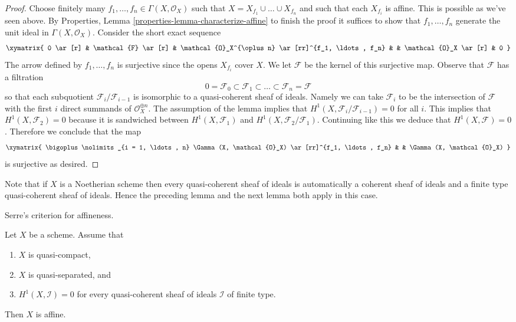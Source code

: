 \begin{proof}
\medskip\noindent
Choose finitely many $f_1, \ldots, f_n \in \Gamma(X, \mathcal{O}_X)$
such that $X = X_{f_1} \cup \ldots \cup X_{f_n}$ and such that each
$X_{f_i}$ is affine. This is possible as we've seen above.
By Properties, Lemma \ref{properties-lemma-characterize-affine}
to finish the proof it suffices
to show that $f_1, \ldots, f_n$ generate the unit ideal in
$\Gamma(X, \mathcal{O}_X)$. Consider the short exact sequence
$$
\xymatrix{
0 \ar[r] &
\mathcal{F} \ar[r] &
\mathcal{O}_X^{\oplus n} \ar[rr]^{f_1, \ldots, f_n} & &
\mathcal{O}_X \ar[r] &
0
}
$$
The arrow defined by $f_1, \ldots, f_n$ is surjective since the
opens $X_{f_i}$ cover $X$. We let $\mathcal{F}$ be the kernel
of this surjective map.
Observe that $\mathcal{F}$ has a filtration
$$
0 = \mathcal{F}_0 \subset \mathcal{F}_1 \subset
\ldots \subset \mathcal{F}_n = \mathcal{F}
$$
so that each subquotient $\mathcal{F}_i/\mathcal{F}_{i - 1}$ is
isomorphic to a quasi-coherent sheaf of ideals.
Namely we can take $\mathcal{F}_i$ to be the intersection of
$\mathcal{F}$ with the first $i$ direct summands of
$\mathcal{O}_X^{\oplus n}$.
The assumption
of the lemma implies that $H^1(X, \mathcal{F}_i/\mathcal{F}_{i - 1}) = 0$
for all $i$. This implies that
$H^1(X, \mathcal{F}_2) = 0$ because it is sandwiched between
$H^1(X, \mathcal{F}_1)$ and $H^1(X, \mathcal{F}_2/\mathcal{F}_1)$.
Continuing like this we deduce that $H^1(X, \mathcal{F}) = 0$.
Therefore we conclude that the map
$$
\xymatrix{
\bigoplus\nolimits_{i = 1, \ldots, n} \Gamma(X, \mathcal{O}_X)
\ar[rr]^{f_1, \ldots, f_n} & &
\Gamma(X, \mathcal{O}_X)
}
$$
is surjective as desired.
\end{proof}

\noindent
Note that if $X$ is a Noetherian scheme then every quasi-coherent
sheaf of ideals is automatically a coherent sheaf of ideals and a
finite type quasi-coherent sheaf of ideals. Hence
the preceding lemma and the next lemma both apply in this case.

\begin{lemma}
\label{lemma-quasi-separated-h1-zero-covering}
\begin{reference}
\cite{Serre-criterion}
\end{reference}
\begin{slogan}
Serre's criterion for affineness.
\end{slogan}
Let $X$ be a scheme. Assume that
\begin{enumerate}
\item $X$ is quasi-compact,
\item $X$ is quasi-separated, and
\item $H^1(X, \mathcal{I}) = 0$ for every quasi-coherent sheaf
of ideals $\mathcal{I}$ of finite type.
\end{enumerate}
Then $X$ is affine.
\end{lemma}


